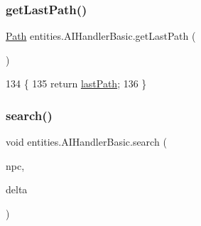 \subsubsection{\texorpdfstring{get\+Last\+Path()}{getLastPath()}}
{\footnotesize\ttfamily \mbox{\hyperlink{classorg_1_1newdawn_1_1slick_1_1util_1_1pathfinding_1_1_path}{Path}} entities.\+A\+I\+Handler\+Basic.\+get\+Last\+Path (\begin{DoxyParamCaption}{ }\end{DoxyParamCaption})\hspace{0.3cm}{\ttfamily [inline]}}


\begin{DoxyCode}
134                               \{
135         \textcolor{keywordflow}{return} \mbox{\hyperlink{classentities_1_1_a_i_handler_basic_a602787aae6ac3b507885afeece3f7b3f}{lastPath}};
136     \}
\end{DoxyCode}
\mbox{\label{classentities_1_1_a_i_handler_basic_a3bc305447e74f28a7187b6f2fd80686a}} 
\subsubsection{\texorpdfstring{search()}{search()}}
{\footnotesize\ttfamily void entities.\+A\+I\+Handler\+Basic.\+search (\begin{DoxyParamCaption}\item[{\mbox{\hyperlink{classentities_1_1_n_p_c}{N\+PC}}}]{npc,  }\item[{long}]{delta }\end{DoxyParamCaption})\hspace{0.3cm}{\ttfamily [inline]}}


